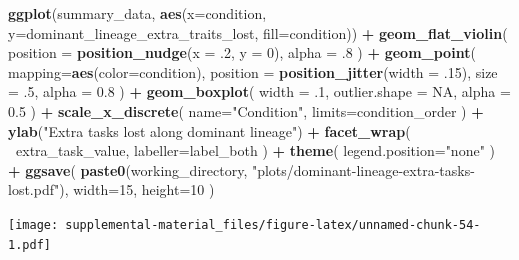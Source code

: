 \documentclass[]{book}
\newenvironment{Shaded}{\begin{snugshade}}{\end{snugshade}}
\newcommand{\DataTypeTok}[1]{\textcolor[rgb]{0.13,0.29,0.53}{#1}}
\newcommand{\DecValTok}[1]{\textcolor[rgb]{0.00,0.00,0.81}{#1}}
\newcommand{\FloatTok}[1]{\textcolor[rgb]{0.00,0.00,0.81}{#1}}
\newcommand{\KeywordTok}[1]{\textcolor[rgb]{0.13,0.29,0.53}{\textbf{#1}}}
\newcommand{\NormalTok}[1]{#1}
\newcommand{\OperatorTok}[1]{\textcolor[rgb]{0.81,0.36,0.00}{\textbf{#1}}}
\newcommand{\OtherTok}[1]{\textcolor[rgb]{0.56,0.35,0.01}{#1}}
\newcommand{\StringTok}[1]{\textcolor[rgb]{0.31,0.60,0.02}{#1}}
\begin{document}
\begin{Shaded}
\begin{Highlighting}[]
\KeywordTok{ggplot}\NormalTok{(summary_data, }\KeywordTok{aes}\NormalTok{(}\DataTypeTok{x=}\NormalTok{condition, }\DataTypeTok{y=}\NormalTok{dominant_lineage_extra_traits_lost, }\DataTypeTok{fill=}\NormalTok{condition)) }\OperatorTok{+}
\StringTok{  }\KeywordTok{geom_flat_violin}\NormalTok{(}
    \DataTypeTok{position =} \KeywordTok{position_nudge}\NormalTok{(}\DataTypeTok{x =} \FloatTok{.2}\NormalTok{, }\DataTypeTok{y =} \DecValTok{0}\NormalTok{),}
    \DataTypeTok{alpha =} \FloatTok{.8}
\NormalTok{  ) }\OperatorTok{+}
\StringTok{  }\KeywordTok{geom_point}\NormalTok{(}
    \DataTypeTok{mapping=}\KeywordTok{aes}\NormalTok{(}\DataTypeTok{color=}\NormalTok{condition),}
    \DataTypeTok{position =} \KeywordTok{position_jitter}\NormalTok{(}\DataTypeTok{width =} \FloatTok{.15}\NormalTok{),}
    \DataTypeTok{size =} \FloatTok{.5}\NormalTok{,}
    \DataTypeTok{alpha =} \FloatTok{0.8}
\NormalTok{  ) }\OperatorTok{+}
\StringTok{  }\KeywordTok{geom_boxplot}\NormalTok{(}
    \DataTypeTok{width =} \FloatTok{.1}\NormalTok{,}
    \DataTypeTok{outlier.shape =} \OtherTok{NA}\NormalTok{,}
    \DataTypeTok{alpha =} \FloatTok{0.5}
\NormalTok{  ) }\OperatorTok{+}
\StringTok{  }\KeywordTok{scale_x_discrete}\NormalTok{(}
    \DataTypeTok{name=}\StringTok{"Condition"}\NormalTok{,}
    \DataTypeTok{limits=}\NormalTok{condition_order}
\NormalTok{  ) }\OperatorTok{+}
\StringTok{  }\KeywordTok{ylab}\NormalTok{(}\StringTok{"Extra tasks lost along dominant lineage"}\NormalTok{) }\OperatorTok{+}
\StringTok{  }\KeywordTok{facet_wrap}\NormalTok{(}
    \OperatorTok{~}\NormalTok{extra_task_value,}
    \DataTypeTok{labeller=}\NormalTok{label_both}
\NormalTok{  ) }\OperatorTok{+}
\StringTok{  }\KeywordTok{theme}\NormalTok{(}
    \DataTypeTok{legend.position=}\StringTok{"none"}
\NormalTok{  ) }\OperatorTok{+}
\StringTok{  }\KeywordTok{ggsave}\NormalTok{(}
    \KeywordTok{paste0}\NormalTok{(working_directory, }\StringTok{"plots/dominant-lineage-extra-tasks-lost.pdf"}\NormalTok{),}
    \DataTypeTok{width=}\DecValTok{15}\NormalTok{,}
    \DataTypeTok{height=}\DecValTok{10}
\NormalTok{  )}
\end{Highlighting}
\end{Shaded}

\texttt{[image: supplemental-material\_files/figure-latex/unnamed-chunk-54-1.pdf]}

\begin{Shaded}
\end{Shaded}
\end{document}
